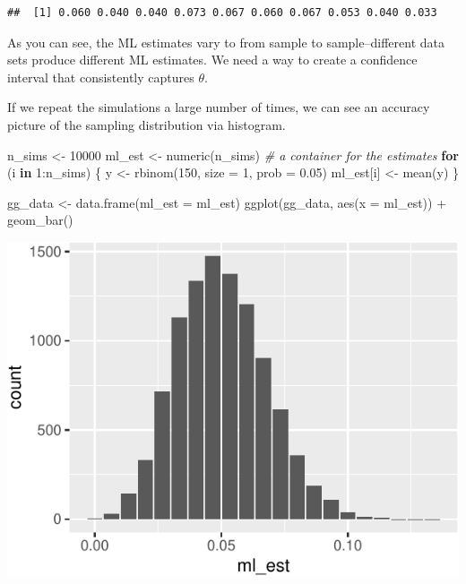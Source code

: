 \documentclass[
]{book}
\newenvironment{Shaded}{\begin{snugshade}}{\end{snugshade}}
\newcommand{\AttributeTok}[1]{\textcolor[rgb]{0.77,0.63,0.00}{#1}}
\newcommand{\CommentTok}[1]{\textcolor[rgb]{0.56,0.35,0.01}{\textit{#1}}}
\newcommand{\ControlFlowTok}[1]{\textcolor[rgb]{0.13,0.29,0.53}{\textbf{#1}}}
\newcommand{\DecValTok}[1]{\textcolor[rgb]{0.00,0.00,0.81}{#1}}
\newcommand{\FloatTok}[1]{\textcolor[rgb]{0.00,0.00,0.81}{#1}}
\newcommand{\FunctionTok}[1]{\textcolor[rgb]{0.00,0.00,0.00}{#1}}
\newcommand{\NormalTok}[1]{#1}
\newcommand{\OtherTok}[1]{\textcolor[rgb]{0.56,0.35,0.01}{#1}}
\newcommand{\SpecialCharTok}[1]{\textcolor[rgb]{0.00,0.00,0.00}{#1}}
\begin{document}
\begin{verbatim}
##  [1] 0.060 0.040 0.040 0.073 0.067 0.060 0.067 0.053 0.040 0.033
\end{verbatim}

As you can see, the ML estimates vary to from sample to sample--different data sets produce different ML estimates. We need a way to create a confidence interval that consistently captures \(\theta\).

If we repeat the simulations a large number of times, we can see an accuracy picture of the sampling distribution via histogram.

\begin{Shaded}
\begin{Highlighting}[]
\NormalTok{n\_sims }\OtherTok{\textless{}{-}} \DecValTok{10000}
\NormalTok{ml\_est }\OtherTok{\textless{}{-}} \FunctionTok{numeric}\NormalTok{(n\_sims)  }\CommentTok{\# a container for the estimates}
\ControlFlowTok{for}\NormalTok{ (i }\ControlFlowTok{in} \DecValTok{1}\SpecialCharTok{:}\NormalTok{n\_sims) \{}
\NormalTok{  y }\OtherTok{\textless{}{-}} \FunctionTok{rbinom}\NormalTok{(}\DecValTok{150}\NormalTok{, }\AttributeTok{size =} \DecValTok{1}\NormalTok{, }\AttributeTok{prob =} \FloatTok{0.05}\NormalTok{)}
\NormalTok{  ml\_est[i] }\OtherTok{\textless{}{-}} \FunctionTok{mean}\NormalTok{(y)}
\NormalTok{\}}

\NormalTok{gg\_data }\OtherTok{\textless{}{-}} \FunctionTok{data.frame}\NormalTok{(}\AttributeTok{ml\_est =}\NormalTok{ ml\_est)}
\FunctionTok{ggplot}\NormalTok{(gg\_data, }\FunctionTok{aes}\NormalTok{(}\AttributeTok{x =}\NormalTok{ ml\_est)) }\SpecialCharTok{+} 
  \FunctionTok{geom\_bar}\NormalTok{()}
\end{Highlighting}
\end{Shaded}

\includegraphics{01-04-bias-and-consistency_files/figure-latex/unnamed-chunk-3-1.pdf}
\end{document}
